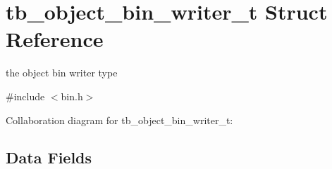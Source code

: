 \hypertarget{structtb__object__bin__writer__t}{\section{tb\-\_\-object\-\_\-bin\-\_\-writer\-\_\-t Struct Reference}
\label{structtb__object__bin__writer__t}
}


the object bin writer type  




{\ttfamily \#include $<$bin.\-h$>$}



Collaboration diagram for tb\-\_\-object\-\_\-bin\-\_\-writer\-\_\-t\-:
\subsection*{Data Fields}
